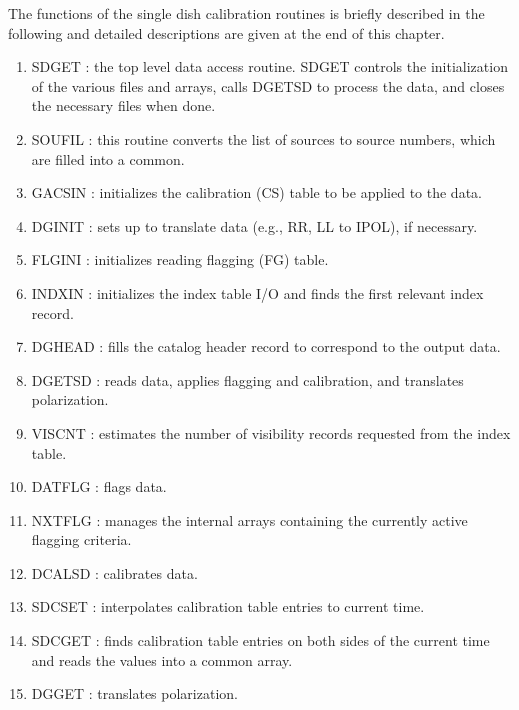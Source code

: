    The functions of the single dish calibration routines is briefly
described in the following and detailed descriptions are given  at the
end of this chapter.
\begin{enumerate} %
\item SDGET : the top level data access routine. SDGET
controls the initialization of the various files and arrays, calls
DGETSD to process the data, and closes the necessary files when done.
\item SOUFIL : this routine converts the list of sources
to source numbers, which are filled into a common.
\item GACSIN : initializes the calibration (CS) table to
be applied to the data.
\item DGINIT : sets up to translate data (e.g., RR, LL
to IPOL), if necessary.
\item FLGINI : initializes reading flagging (FG)
table.
\item INDXIN : initializes the index table I/O and finds
the first relevant index record.
\item DGHEAD : fills the catalog header record to
correspond to the output data.
\item DGETSD : reads data, applies flagging and
calibration, and translates polarization.
\item VISCNT : estimates the number of visibility
records requested from the index table.
\item DATFLG : flags data.
\item NXTFLG : manages the internal arrays containing
the currently active flagging criteria.
\item DCALSD : calibrates data.
\item SDCSET : interpolates calibration table entries to
current time.
\item SDCGET : finds calibration table entries on both sides of
the current time and reads the values into a common array.
\item DGGET : translates polarization.

\end{enumerate} %


